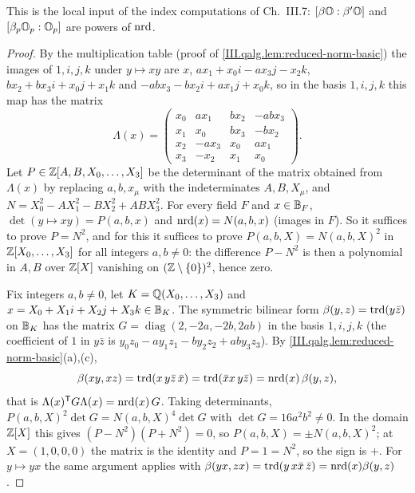 \begin{lemma}
\end{lemma}
\noindent This is the local input of the index computations of Ch.~III.7: $[\beta\mathbb{O}:\beta'\mathbb{O}]$ and $[\beta_p\mathbb{O}_p:\mathbb{O}_p]$ are powers of
$\operatorname{nrd}$.
\begin{proof}
By the multiplication table (proof of \cref{III.qalg.lem:reduced-norm-basic}) the images of $1,i,j,k$ under $y\mapsto xy$ are
$x$, $ax_1+x_0i-ax_3j-x_2k$, $bx_2+bx_3i+x_0j+x_1k$ and $-abx_3-bx_2i+ax_1j+x_0k$, so in the basis $1,i,j,k$ this map has the matrix
\[
  \Lambda(x)=\begin{pmatrix}x_0&ax_1&bx_2&-abx_3\\ x_1&x_0&bx_3&-bx_2\\ x_2&-ax_3&x_0&ax_1\\ x_3&-x_2&x_1&x_0\end{pmatrix}.
\]
Let $P\in\mathbb{Z}[A,B,X_0,\dots,X_3]$ be the determinant of the matrix obtained from $\Lambda(x)$ by replacing $a,b,x_\mu$ with the indeterminates
$A,B,X_\mu$, and $N=X_0^2-AX_1^2-BX_2^2+ABX_3^2$. For every field $F$ and $x\in\mathbb{B}_F$, $\det(y\mapsto xy)=P(a,b,x)$ and $\operatorname{nrd}(x)=N(a,b,x)$
(images in $F$). So it suffices to prove $P=N^2$, and for this it suffices to prove $P(a,b,X)=N(a,b,X)^2$ in $\mathbb{Z}[X_0,\dots,X_3]$ for all integers
$a,b\ne0$: the difference $P-N^2$ is then a polynomial in $A,B$ over $\mathbb{Z}[X]$ vanishing on $(\mathbb{Z}\setminus\{0\})^2$, hence zero.

Fix integers $a,b\ne0$, let $K=\mathbb{Q}(X_0,\dots,X_3)$ and $x=X_0+X_1i+X_2j+X_3k\in\mathbb{B}_K$. The symmetric bilinear form $\beta(y,z)=\operatorname{trd}(y\bar z)$ on $\mathbb{B}_K$
has the matrix $G=\operatorname{diag}(2,-2a,-2b,2ab)$ in the basis $1,i,j,k$ (the coefficient of $1$ in $y\bar z$ is
$y_0z_0-ay_1z_1-by_2z_2+aby_3z_3$). By \cref{III.qalg.lem:reduced-norm-basic}(a),(c),
\[
  \beta(xy,xz)=\operatorname{trd}(x\,y\bar z\,\bar x)=\operatorname{trd}(\bar xx\,y\bar z)=\operatorname{nrd}(x)\,\beta(y,z),
\]
that is $\Lambda(x)^{\mathsf T}G\Lambda(x)=\operatorname{nrd}(x)\,G$. Taking determinants, $P(a,b,X)^2\det G=N(a,b,X)^4\det G$ with $\det G=16a^2b^2\ne0$. In the
domain $\mathbb{Z}[X]$ this gives $(P-N^2)(P+N^2)=0$, so $P(a,b,X)=\pm N(a,b,X)^2$; at $X=(1,0,0,0)$ the matrix is the identity and $P=1=N^2$, so the sign
is $+$. For $y\mapsto yx$ the same argument applies with $\beta(yx,zx)=\operatorname{trd}(y\,x\bar x\,\bar z)=\operatorname{nrd}(x)\beta(y,z)$.
\end{proof}

